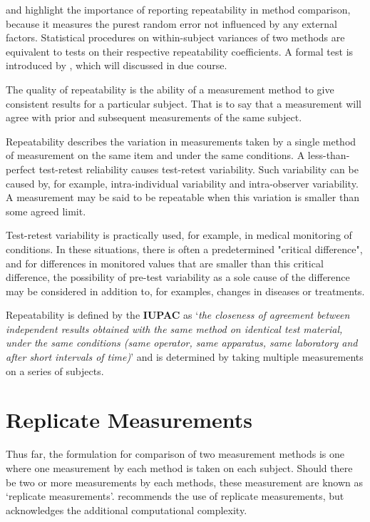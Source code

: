 \documentclass[12pt, a4paper]{report}
\theoremstyle{plain}
\theoremstyle{definition}
\theoremstyle{remark}
\begin{document}
	\citet{Barnhart} and \citet{ARoy2009} highlight the importance of reporting repeatability in method comparison, because it measures the purest random error not influenced by any external factors. Statistical procedures on within-subject variances of two methods are equivalent to tests on their respective repeatability coefficients. A formal test is introduced by \citet{ARoy2009}, which will discussed in due course.
	

	The quality of repeatability is the ability of a measurement method to give consistent results for a particular subject. That is to say that a measurement will agree with prior and subsequent measurements of the same subject.
	
	
	Repeatability describes the variation in measurements taken by a single method of measurement on the same item and under the same conditions. 
	A less-than-perfect test-retest reliability causes test-retest variability. Such variability can be caused by, for example, intra-individual variability and intra-observer variability. 
	A measurement may be said to be repeatable when this variation is smaller than some agreed limit.
	
	Test-retest variability is practically used, for example, in medical monitoring of conditions. In these situations, there is often a predetermined "critical difference", and for differences in monitored values that are smaller than this critical difference, the possibility of pre-test variability as a sole cause of the difference may be considered in addition to, for examples, changes in diseases or treatments.
	
	Repeatability is defined by the \textbf{IUPAC} as `\textit{the closeness of agreement between independent results obtained with the same method on identical test material, under the same conditions (same
		operator, same apparatus, same laboratory and after short intervals of time)}'  and is determined by taking multiple measurements on a series of subjects.
	
	
	
	
	
	\newpage
	\section{Replicate Measurements}
	
	Thus far, the formulation for comparison of two measurement
	methods is one where one measurement by each method is taken on
	each subject. Should there be two or more measurements by each
	methods, these measurement are known as `replicate measurements'.
	\citet{BXC2008} recommends the use of replicate measurements, but
	acknowledges the additional computational complexity.
	
\end{document}
